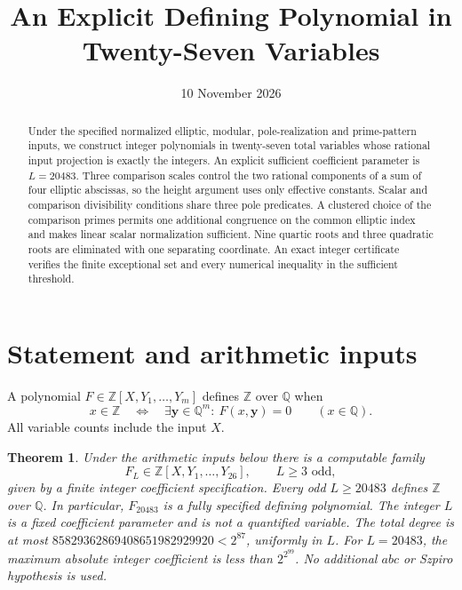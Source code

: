 \documentclass[11pt,a4paper]{article}
\title{An Explicit Defining Polynomial in Twenty-Seven Variables}
\author{}\date{10 November 2026}
\newtheorem{theorem}{Theorem}[section]
\newcommand{\Q}{\mathbb Q}\newcommand{\Z}{\mathbb Z}
\begin{document}
\maketitle
\begin{abstract}
Under the specified normalized elliptic, modular, pole-realization and
prime-pattern inputs, we construct integer polynomials in twenty-seven
total variables whose rational input projection is exactly the integers.
An explicit sufficient coefficient parameter is $L=20483$.
Three comparison scales control the two rational components of a sum
of four elliptic abscissas, so the height argument uses only effective
constants. Scalar and comparison divisibility conditions share three
pole predicates. A clustered choice of the comparison primes permits
one additional congruence on the common elliptic index and makes linear
scalar normalization sufficient. Nine quartic roots and three quadratic
roots are eliminated with one separating coordinate. An exact integer
certificate verifies the finite exceptional set and every numerical
inequality in the sufficient threshold.
\end{abstract}

\section{Statement and arithmetic inputs}

A polynomial $F\in\Z[X,Y_1,\ldots,Y_m]$ defines $\Z$ over $\Q$
when
\[
 x\in\Z\quad\Longleftrightarrow\quad
 \exists\mathbf y\in\Q^m:\ F(x,\mathbf y)=0
 \qquad(x\in\Q).
\]
All variable counts include the input $X$.

\begin{theorem}\label{thm:main}
Under the arithmetic inputs below there is a computable family
\[
 F_L\in\Z[X,Y_1,\ldots,Y_{26}],\qquad L\ge3\text{ odd},
\]
given by a finite integer coefficient specification. Every odd
$L\ge20483$ defines $\Z$ over $\Q$. In particular,
$F_{20483}$ is a fully specified defining polynomial.
The integer $L$ is a fixed coefficient parameter and is not a
quantified variable. The total degree is at most
$85829362869408651982929920<2^{87}$, uniformly in $L$.
For $L=20483$, the maximum absolute integer coefficient is less
than $2^{2^{99}}$. No additional $abc$ or Szpiro hypothesis is used.
\end{theorem}
\end{document}
